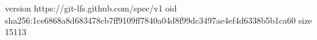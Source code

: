 version https://git-lfs.github.com/spec/v1
oid sha256:1ce6868a8d683478cb7ff9109ff7840a04d8f99dc3497ae4ef4d6338b5b1ca60
size 15113
